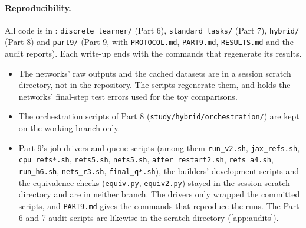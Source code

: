 \paragraph{Reproducibility.} All code is in : \texttt{discrete\_learner/} (Part 6), \texttt{standard\_tasks/} (Part 7), \texttt{hybrid/} (Part 8) and \texttt{part9/} (Part 9, with \texttt{PROTOCOL.md}, \texttt{PART9.md}, \texttt{RESULTS.md} and the audit reports). Each write-up ends with the commands that regenerate its results.
\begin{itemize}
\item The networks' raw outputs and the cached datasets are in a session scratch directory, not in the repository. The scripts regenerate them, and  holds the networks' final-step test errors used for the toy comparisons.
\item The orchestration scripts of Part 8 (\texttt{study/hybrid/orchestration/}) are kept on the working branch only.
\item {\sloppy Part 9's job drivers and queue scripts (among them \texttt{run\_v2.sh}, \texttt{jax\_refs.sh}, \texttt{cpu\_refs*.sh}, \texttt{refs5.sh}, \texttt{nets5.sh}, \texttt{after\_restart2.sh}, \texttt{refs\_a4.sh}, \texttt{run\_h6.sh}, \texttt{nets\_r3.sh}, \texttt{final\_q*.sh}), the builders' development scripts and the equivalence checks (\texttt{equiv.py}, \texttt{equiv2.py}) stayed in the session scratch directory and are in neither branch. The drivers only wrapped the committed scripts, and \texttt{PART9.md} gives the commands that reproduce the runs. The Part 6 and 7 audit scripts are likewise in the scratch directory (\cref{app:audits}).\par}
\end{itemize}
